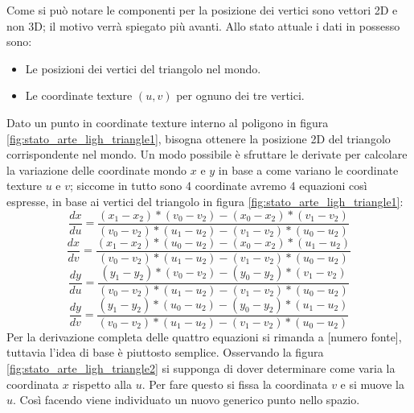 Come si può notare le componenti per la posizione dei vertici sono vettori 2D e non 3D; il motivo verrà spiegato più avanti.
Allo stato attuale i dati in possesso sono:	
\begin{itemize}
\item Le posizioni dei vertici del triangolo nel mondo.
\item Le coordinate texture $(u,v)$ per ognuno dei tre vertici.
\end{itemize}
Dato un punto in coordinate texture interno al poligono in figura \ref{fig:stato_arte_ligh_triangle1}, bisogna ottenere la posizione 2D del triangolo corrispondente nel mondo.
Un modo possibile è sfruttare le derivate per calcolare la variazione delle coordinate mondo $x$ e $y$ in base a come variano le coordinate texture $u$ e $v$; siccome in tutto sono 4 coordinate avremo 4 equazioni così espresse, in base ai vertici del triangolo in figura \ref{fig:stato_arte_ligh_triangle1}:
\\
\begin{equation}
\frac{dx}{du} = \frac{(x_1 - x_2)*(v_0 - v_2) - (x_0 - x_2)*(v_1 - v_2)}{(v_0 - v_2)*(u_1 - u_2) - (v_1 - v_2)*(u_0 - u_2)}
\label{dxdu}
\end{equation}
\begin{equation}
\frac{dx}{dv} = \frac{(x_1 - x_2)*(u_0 - u_2) - (x_0 - x_2)*(u_1 - u_2)}{(v_0 - v_2)*(u_1 - u_2) - (v_1 - v_2)*(u_0 - u_2)}
\label{dxdv} 
\end{equation}
\begin{equation}
\frac{dy}{du} = \frac{(y_1 - y_2)*(v_0 - v_2) - (y_0 - y_2)*(v_1 - v_2)}{(v_0 - v_2)*(u_1 - u_2) - (v_1 - v_2)*(u_0 - u_2)}
\label{dydu}
\end{equation}
\begin{equation}
\frac{dy}{dv} = \frac{(y_1 - y_2)*(u_0 - u_2) - (y_0 - y_2)*(u_1 - u_2)}{(v_0 - v_2)*(u_1 - u_2) - (v_1 - v_2)*(u_0 - u_2)} 
\label{dydv}
\end{equation}
Per la derivazione completa delle quattro equazioni si rimanda a [numero fonte], tuttavia l’idea di base è piuttosto semplice. Osservando la figura \ref{fig:stato_arte_ligh_triangle2} si supponga di dover determinare come varia la coordinata $x$ rispetto alla $u$. Per fare questo si fissa la coordinata $v$ e si muove la $u$. Così facendo viene individuato un nuovo generico punto nello spazio. 
\\
